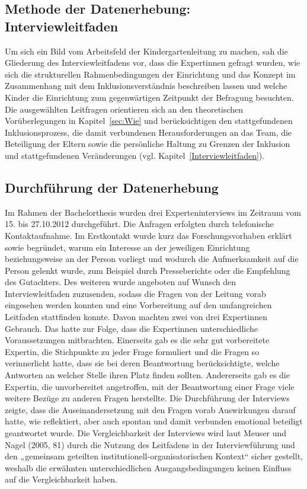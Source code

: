 \subsection{Methode der Datenerhebung: Interviewleitfaden}
Um sich ein Bild vom Arbeitsfeld der Kindergartenleitung zu machen, sah die Gliederung des Interviewleitfadens vor, dass die Expertinnen gefragt wurden, wie sich die strukturellen Rahmenbedingungen der Einrichtung und das Konzept im Zusammenhang mit dem Inklusionsverständnis beschreiben lassen und welche Kinder die Einrichtung zum gegenwärtigen Zeitpunkt der Befragung besuchten. Die ausgewählten Leitfragen orientieren sich an den theoretischen Vorüberlegungen in Kapitel~\ref{sec:Wie} und berücksichtigen den stattgefundenen Inklusionsprozess, die damit verbundenen Herausforderungen an das Team, die Beteiligung der Eltern sowie die persönliche Haltung zu Grenzen der Inklusion und stattgefundenen Veränderungen (vgl. Kapitel~\ref{Interviewleitfaden}).

\subsection{Durchführung der Datenerhebung}
Im Rahmen der Bachelorthesis wurden drei Experteninterviews im Zeitraum vom 15. bis 27.10.2012 durchgeführt. 
Die Anfragen erfolgten durch telefonische Kontaktaufnahme. Im Erstkontakt wurde kurz das Forschungsvorhaben erklärt sowie begründet, warum ein Interesse an der jeweiligen Einrichtung beziehungsweise an der Person vorliegt und wodurch die Aufmerksamkeit auf die Person gelenkt wurde, zum Beispiel durch Presseberichte oder die Empfehlung des Gutachters. 
Des weiteren wurde angeboten auf Wunsch den Interviewleitfaden zuzusenden, sodass die Fragen von der Leitung vorab eingesehen werden konnten und eine Vorbereitung auf den umfangreichen Leitfaden stattfinden konnte. Davon machten zwei von drei Expertinnen Gebrauch. Das hatte zur Folge, dass die Expertinnen unterschiedliche Voraussetzungen mitbrachten. Einerseits gab es die sehr gut vorbereitete Expertin, die Stichpunkte zu jeder Frage formuliert und die Fragen so verinnerlicht hatte, dass sie bei deren Beantwortung berücksichtigte, welche Antworten an welcher Stelle ihren Platz finden sollten. Andererseits gab es die Expertin, die unvorbereitet angetroffen, mit der Beantwortung einer Frage viele weitere Bezüge zu anderen Fragen herstellte. Die Durchführung der Interviews zeigte, dass die Auseinandersetzung mit den Fragen vorab Auswirkungen darauf hatte, wie reflektiert, aber auch spontan und damit verbunden emotional beteiligt geantwortet wurde.     
Die Vergleichbarkeit der Interviews wird laut Meuser und Nagel (2005, 81) durch die Nutzung des Leitfadens in der Interviewführung und den „gemeinsam geteilten institutionell-organisatorischen Kontext“ sicher gestellt, weshalb die erwähnten unterschiedlichen Ausgangsbedingungen keinen Einfluss auf die Vergleichbarkeit haben.

